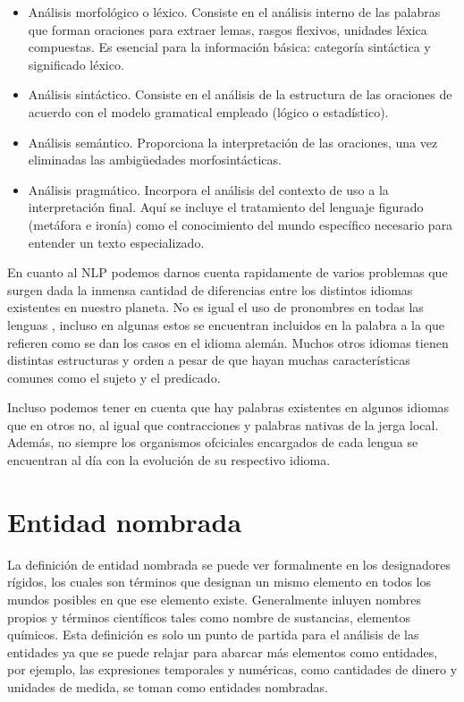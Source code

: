 \documentclass[runningheads]{llncs}
\begin{document}
\begin{itemize}
    \item Análisis morfológico o léxico. Consiste en el análisis interno de las palabras que forman oraciones para extraer lemas, rasgos flexivos, unidades léxica compuestas. Es esencial para la información básica: categoría sintáctica y significado léxico.
    \item Análisis sintáctico. Consiste en el análisis de la estructura de las oraciones de acuerdo con el modelo gramatical empleado (lógico o estadístico).
    \item Análisis semántico. Proporciona la interpretación de las oraciones, una vez eliminadas las ambigüedades morfosintácticas.
    \item Análisis pragmático. Incorpora el análisis del contexto de uso a la interpretación final. Aquí se incluye el tratamiento del lenguaje figurado (metáfora e ironía) como el conocimiento del mundo específico necesario para entender un texto especializado.
\end{itemize}


 
En cuanto al NLP podemos darnos cuenta rapidamente de varios problemas que surgen dada la inmensa cantidad de diferencias entre los distintos idiomas existentes en nuestro planeta. No es igual el uso de pronombres en todas las lenguas , incluso en algunas estos se encuentran incluidos en la palabra a la que refieren como se dan los casos en el idioma alemán. Muchos otros idiomas tienen distintas estructuras y orden a pesar de que hayan muchas características comunes como el sujeto y el predicado.

Incluso podemos tener en cuenta que hay palabras existentes en algunos idiomas que en otros no, al igual que contracciones y palabras nativas de la jerga local. Además, no siempre los organismos ofciciales encargados de cada lengua se encuentran al día con la evolución de su respectivo idioma.


\section{Entidad nombrada}

La definición de entidad nombrada se puede ver formalmente en los designadores rígidos\cite{rigid_designator}, los cuales son términos que designan un mismo elemento en todos los mundos posibles en que ese elemento existe. Generalmente inluyen nombres propios y términos científicos tales como nombre de sustancias, elementos químicos. Esta definición es solo un punto de partida para el análisis de las entidades ya que se puede relajar  para abarcar más elementos como entidades, por ejemplo, las expresiones temporales y numéricas, como cantidades de dinero y unidades de medida, se toman como entidades nombradas. 
\end{document}
